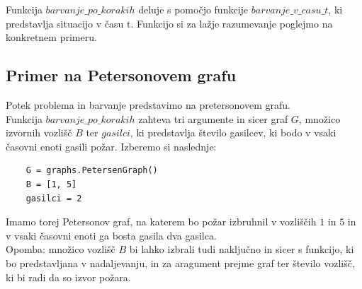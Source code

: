 \documentclass[a4paper, 12pt]{article}
\begin{document}
\noindent Funkcija $barvanje\_po\_korakih$ deluje s pomočjo funkcije $barvanje\_v\_casu\_t$, ki predstavlja
situacijo v času t. Funkcijo si za lažje razumevanje poglejmo na konkretnem primeru.

\subsection{Primer na Petersonovem grafu}
\noindent Potek problema in barvanje predstavimo na pretersonovem grafu. \\ 
Funkcija $barvanje\_po\_korakih$ zahteva tri argumente
in sicer graf $G$, množico izvornih vozlišč $B$ ter $gasilci$, ki predstavlja število gasilcev, ki 
bodo v vsaki časovni enoti gasili požar.
Izberemo si naslednje:
\begin{small}
\begin{verbatim}
    G = graphs.PetersenGraph()
    B = [1, 5]
    gasilci = 2
\end{verbatim}
\end{small}
Imamo torej Petersonov graf, na katerem bo požar izbruhnil v vozliščih $1$ in $5$ in v vsaki časovni enoti ga bosta
gasila dva gasilca. \\
Opomba: množico vozlišč $B$ bi lahko izbrali tudi naključno in sicer s funkcijo, ki bo predstavljana
v nadaljevanju, in za aragument prejme graf ter število vozlišč, ki bi radi da so izvor požara. \\
\end{document}
